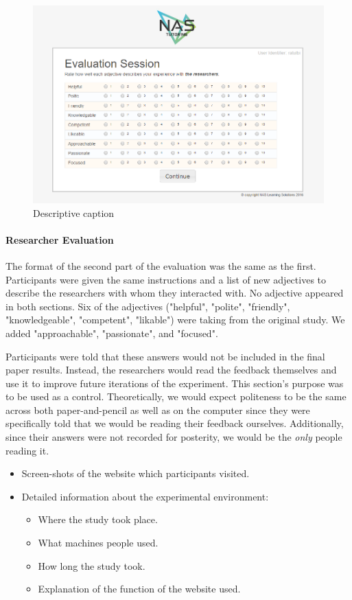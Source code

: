 \documentclass{sig-alternate-05-2015}
\begin{document}
\begin{figure}[!h]
    \includegraphics[width=\linewidth]{figures/website/13_eval2.png}
    \caption{Descriptive caption}
\end{figure}

\paragraph{Researcher Evaluation}
The format of the second part of the evaluation was the same as the first. Participants were given the same instructions  and a list of new adjectives to describe the researchers with whom they interacted with.  No adjective appeared in both sections.  Six of the adjectives ("helpful", "polite", "friendly", "knowledgeable", "competent", "likable") were taking from the original study. We added "approachable", "passionate", and "focused".

Participants were told that these answers would not be included in the final paper results.  Instead, the researchers would read the feedback themselves and use it to improve future iterations of the experiment.  This section's purpose was to be used as a control.  Theoretically, we would expect politeness to be the same across both paper-and-pencil as well as on the computer since they were specifically told that we would be reading their feedback ourselves.  Additionally, since their answers were not recorded for posterity, we would be the \textit{only} people reading it.

\begin{itemize}
    \item Screen-shots of the website which participants visited.
    \item Detailed information about the experimental environment: 
    \begin{itemize}
        \item Where the study took place.
        \item What machines people used.
        \item How long the study took.
        \item Explanation of the function of the website used.
    \end{itemize}
\end{itemize}
 
\end{document}
